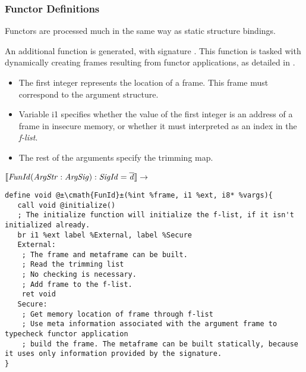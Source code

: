 \subsubsection{Functor Definitions}
Functors are processed much in the same way as static structure bindings.

An additional function is generated, with signature .
This function is tasked with dynamically creating frames resulting from functor applications, as detailed in .

\begin{itemize}
\item
The first integer represents the location of a frame. 
This frame must correspond to the argument structure.

\item
Variable i1 specifies whether the value of the first integer is an address of a frame in insecure memory, or whether it must interpreted as an index in the \emph{f-list}.

\item
The rest of the arguments specify the trimming map.
\end{itemize}

$\llbracket\mathit{FunId(ArgStr:ArgSig):SigId = \overline{d}}\rrbracket \rightarrow$

\begin{lstlisting}[language={[x86masm]Assembler}]
define void @±\cmath{FunId}±(%int %frame, i1 %ext, i8* %vargs){
   call void @initialize()
   ; The initialize function will initialize the f-list, if it isn't initialized already.
   br i1 %ext label %External, label %Secure
   External:
    ; The frame and metaframe can be built.
    ; Read the trimming list
    ; No checking is necessary.
    ; Add frame to the f-list.
    ret void
   Secure:
    ; Get memory location of frame through f-list
    ; Use meta information associated with the argument frame to typecheck functor application
    ; build the frame. The metaframe can be built statically, because it uses only information provided by the signature.
}
\end{lstlisting}

